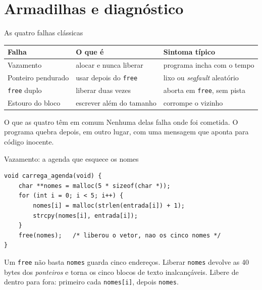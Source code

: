\documentclass[aspectratio=169]{beamer}
\begin{document}
\section{Armadilhas e diagnóstico}

\begin{frame}{As quatro falhas clássicas}
  \begin{center}
  \small
  \begin{tabular}{lll}
    \toprule
    Falha & O que é & Sintoma típico \\
    \midrule
    Vazamento          & alocar e nunca liberar        & programa incha com o tempo \\
    Ponteiro pendurado & usar depois do \texttt{free}  & lixo ou \emph{segfault} aleatório \\
    \texttt{free} duplo & liberar duas vezes           & aborta em \texttt{free}, sem pista \\
    Estouro do bloco   & escrever além do tamanho      & corrompe o vizinho \\
    \bottomrule
  \end{tabular}
  \end{center}
  \begin{alertblock}{O que as quatro têm em comum}
    Nenhuma delas falha onde foi cometida. O programa quebra depois, em outro
    lugar, com uma mensagem que aponta para código inocente.
  \end{alertblock}
\end{frame}

\begin{frame}[fragile]{Vazamento: a agenda que esquece os nomes}
\begin{lstlisting}[basicstyle=\ttfamily\scriptsize]
void carrega_agenda(void) {
    char **nomes = malloc(5 * sizeof(char *));
    for (int i = 0; i < 5; i++) {
        nomes[i] = malloc(strlen(entrada[i]) + 1);
        strcpy(nomes[i], entrada[i]);
    }
    free(nomes);   /* liberou o vetor, nao os cinco nomes */
}
\end{lstlisting}
  \begin{alertblock}{Um \texttt{free} não basta}
    \texttt{nomes} guarda cinco endereços. Liberar \texttt{nomes} devolve as
    40 bytes dos \emph{ponteiros} e torna os cinco blocos de texto
    inalcançáveis. Libere de dentro para fora: primeiro cada
    \texttt{nomes[i]}, depois \texttt{nomes}.
  \end{alertblock}
\end{frame}
\end{document}

